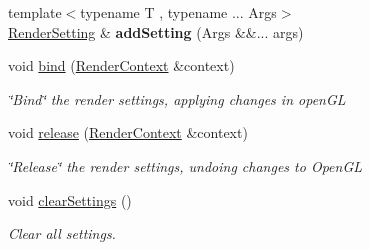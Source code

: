 \begin{Indent}
\begin{DoxyCompactItemize}
\mbox{\label{classrev_1_1_render_settings_ab82b7abd0fa20feaa86c0a307e251855}} 
{\footnotesize template$<$typename T , typename ... Args$>$ }\\\mbox{\hyperlink{classrev_1_1_render_setting}{Render\+Setting}} \& {\bfseries add\+Setting} (Args \&\&... args)
\item 
\mbox{\label{classrev_1_1_render_settings_ad7c8f477a5dbb4b1a9374ef13c9de01c}} 
void \mbox{\hyperlink{classrev_1_1_render_settings_ad7c8f477a5dbb4b1a9374ef13c9de01c}{bind}} (\mbox{\hyperlink{classrev_1_1_render_context}{Render\+Context}} \&context)
\begin{DoxyCompactList}\small\item\em \char`\"{}\+Bind\char`\"{} the render settings, applying changes in open\+GL \end{DoxyCompactList}\item 
\mbox{\label{classrev_1_1_render_settings_a02f6eae0984b6101500b44445496e60e}} 
void \mbox{\hyperlink{classrev_1_1_render_settings_a02f6eae0984b6101500b44445496e60e}{release}} (\mbox{\hyperlink{classrev_1_1_render_context}{Render\+Context}} \&context)
\begin{DoxyCompactList}\small\item\em \char`\"{}\+Release\char`\"{} the render settings, undoing changes to Open\+GL \end{DoxyCompactList}\item 
\mbox{\label{classrev_1_1_render_settings_ad19f8cf3fc0fe9cbb6a50a703a7f3029}} 
void \mbox{\hyperlink{classrev_1_1_render_settings_ad19f8cf3fc0fe9cbb6a50a703a7f3029}{clear\+Settings}} ()
\begin{DoxyCompactList}\small\item\em Clear all settings. \end{DoxyCompactList}\end{DoxyCompactItemize}
\end{Indent}
